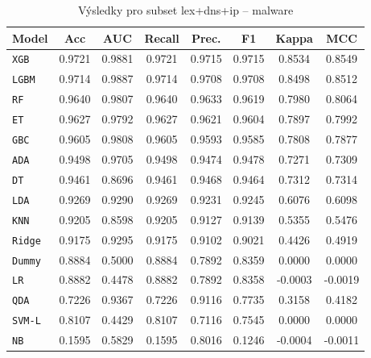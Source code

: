 \begin{table}[H]
  \centering
  \small
  \caption{Výsledky pro subset lex+dns+ip – malware}
  \begin{tabular}{|l|c|c|c|c|c|c|c|}
    \hline
    \textbf{Model} & \textbf{Acc} & \textbf{AUC} & \textbf{Recall} & \textbf{Prec.} & \textbf{F1} & \textbf{Kappa} & \textbf{MCC} \\
    \hline
    \texttt{XGB} & 0.9721 & 0.9881 & 0.9721 & 0.9715 & 0.9715 & 0.8534 & 0.8549 \\
    \texttt{LGBM} & 0.9714 & 0.9887 & 0.9714 & 0.9708 & 0.9708 & 0.8498 & 0.8512 \\
    \texttt{RF} & 0.9640 & 0.9807 & 0.9640 & 0.9633 & 0.9619 & 0.7980 & 0.8064 \\
    \texttt{ET} & 0.9627 & 0.9792 & 0.9627 & 0.9621 & 0.9604 & 0.7897 & 0.7992 \\
    \texttt{GBC} & 0.9605 & 0.9808 & 0.9605 & 0.9593 & 0.9585 & 0.7808 & 0.7877 \\
    \texttt{ADA} & 0.9498 & 0.9705 & 0.9498 & 0.9474 & 0.9478 & 0.7271 & 0.7309 \\
    \texttt{DT} & 0.9461 & 0.8696 & 0.9461 & 0.9468 & 0.9464 & 0.7312 & 0.7314 \\
    \texttt{LDA} & 0.9269 & 0.9290 & 0.9269 & 0.9231 & 0.9245 & 0.6076 & 0.6098 \\
    \texttt{KNN} & 0.9205 & 0.8598 & 0.9205 & 0.9127 & 0.9139 & 0.5355 & 0.5476 \\
    \texttt{Ridge} & 0.9175 & 0.9295 & 0.9175 & 0.9102 & 0.9021 & 0.4426 & 0.4919 \\
    \texttt{Dummy} & 0.8884 & 0.5000 & 0.8884 & 0.7892 & 0.8359 & 0.0000 & 0.0000 \\
    \texttt{LR} & 0.8882 & 0.4478 & 0.8882 & 0.7892 & 0.8358 & -0.0003 & -0.0019 \\
    \texttt{QDA} & 0.7226 & 0.9367 & 0.7226 & 0.9116 & 0.7735 & 0.3158 & 0.4182 \\
    \texttt{SVM-L} & 0.8107 & 0.4429 & 0.8107 & 0.7116 & 0.7545 & 0.0000 & 0.0000 \\
    \texttt{NB} & 0.1595 & 0.5829 & 0.1595 & 0.8016 & 0.1246 & -0.0004 & -0.0011 \\
    \hline
  \end{tabular}
\end{table}
\vspace{0.5cm}

